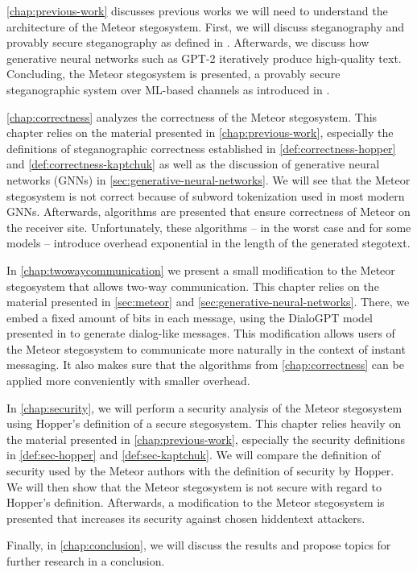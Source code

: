 \autoref{chap:previous-work} discusses previous works we will need to understand the architecture of the Meteor stegosystem.
First, we will discuss steganography and provably secure steganography as defined in \cite{Hopper2004}.
Afterwards, we discuss how generative neural networks such as GPT-2 iteratively produce high-quality text.
Concluding, the Meteor stegosystem is presented, a provably secure steganographic system over ML-based channels as introduced in \cite{Meteor2021}.

\autoref{chap:correctness} analyzes the correctness of the Meteor stegosystem. 
This chapter relies on the material presented in \autoref{chap:previous-work}, especially the definitions of steganographic correctness established in \autoref{def:correctness-hopper} and \autoref{def:correctness-kaptchuk} as well as the discussion of generative neural networks (GNNs) in \autoref{sec:generative-neural-networks}.
We will see that the Meteor stegosystem is not correct because of subword tokenization used in most modern GNNs.
Afterwards, algorithms are presented that ensure correctness of Meteor on the receiver site.
Unfortunately, these algorithms -- in the worst case and for some models -- introduce overhead exponential in the length of the generated stegotext.

In \autoref{chap:twowaycommunication} we present a small modification to the Meteor stegosystem that allows two-way communication.
This chapter relies on the material presented in \autoref{sec:meteor} and \autoref{sec:generative-neural-networks}.
There, we embed a fixed amount of bits in each message, using the DialoGPT model presented in \cite{Zhang2020} to generate dialog-like messages.
This modification allows users of the Meteor stegosystem to communicate more naturally in the context of instant messaging.
It also makes sure that the algorithms from \autoref{chap:correctness} can be applied more conveniently with smaller overhead.

In \autoref{chap:security}, we will perform a security analysis of the Meteor stegosystem using Hopper's definition of a secure stegosystem.
This chapter relies heavily on the material presented in \autoref{chap:previous-work}, especially the security definitions in \autoref{def:sec-hopper} and \autoref{def:sec-kaptchuk}.
We will compare the definition of security used by the Meteor authors with the definition of security by Hopper.
We will then show that the Meteor stegosystem is not secure with regard to Hopper's definition.
Afterwards, a modification to the Meteor stegosystem is presented that increases its security against chosen hiddentext attackers.

Finally, in \autoref{chap:conclusion}, we will discuss the results and propose topics for further research in a conclusion.